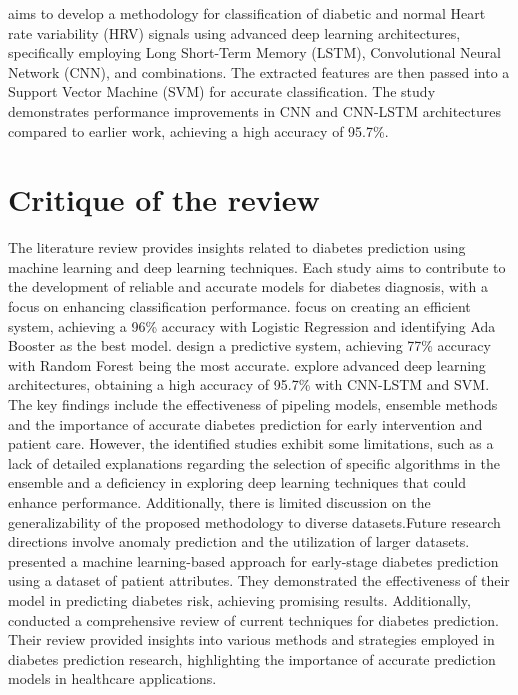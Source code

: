 \cite{swapna2018diabetes} aims to develop a methodology for classification of diabetic and normal Heart rate variability (HRV) signals using advanced deep learning architectures, specifically employing Long Short-Term Memory (LSTM), Convolutional Neural Network (CNN), and combinations. The extracted features are then passed into a Support Vector Machine (SVM) for accurate classification. The study demonstrates performance improvements in CNN and CNN-LSTM architectures compared to earlier work, achieving a high accuracy of 95.7\%. 

\section{Critique of the review} %
The literature review provides insights related to diabetes prediction using machine learning and deep learning techniques. Each study aims to contribute to the development of reliable and accurate models for diabetes diagnosis, with a focus on enhancing classification performance. \cite{mujumdar2019diabetes} focus on creating an efficient system, achieving a 96\% accuracy with Logistic Regression and identifying Ada Booster as the best model. \cite{soni2020diabetes} design a predictive system, achieving 77\% accuracy with Random Forest being the most accurate. \cite{swapna2018diabetes} explore advanced deep learning architectures, obtaining a high accuracy of 95.7\% with CNN-LSTM and SVM. The key findings include the effectiveness of pipeling models, ensemble methods and the importance of accurate diabetes prediction for early intervention and patient care. However, the identified studies exhibit some limitations, such as a lack of detailed explanations regarding the selection of specific algorithms in the ensemble and a deficiency in exploring deep learning techniques that could enhance performance. Additionally, there is limited discussion on the generalizability of the proposed methodology to diverse datasets.Future research directions involve anomaly prediction and the utilization of larger datasets. \cite{yudheksha2022machine} presented a machine learning-based approach for early-stage diabetes prediction using a dataset of patient attributes. They demonstrated the effectiveness of their model in predicting diabetes risk, achieving promising results. Additionally, \cite{larabi2019current} conducted a comprehensive review of current techniques for diabetes prediction. Their review provided insights into various methods and strategies employed in diabetes prediction research, highlighting the importance of accurate prediction models in healthcare applications.
~\\

